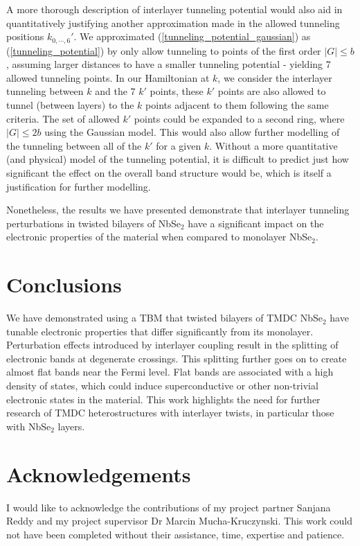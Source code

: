 \documentclass[12pt]{report} %
\begin{document}
A more thorough description of interlayer tunneling potential would also aid in quantitatively justifying another approximation made in the allowed tunneling positions $k_{0, \cdots, 6}'$. We approximated (\ref{tunneling_potential_gaussian}) as (\ref{tunneling_potential}) by only allow tunneling to points of the first order $|G| \leq b$, assuming larger distances to have a smaller tunneling potential - yielding 7 allowed tunneling points. In our Hamiltonian at $k$, we consider the interlayer tunneling between $k$ and the 7 $k'$ points, these $k'$ points are also allowed to tunnel (between layers) to the $k$ points adjacent to them following the same criteria. The set of allowed $k'$ points could be expanded to a second ring, where $|G| \leq 2b$ using the Gaussian model. This would also allow further modelling of the tunneling between all of the $k'$ for a given $k$. Without a more quantitative (and physical) model of the tunneling potential, it is difficult to predict just how significant the effect on the overall band structure would be, which is itself a justification for further modelling.

Nonetheless, the results we have presented demonstrate that interlayer tunneling perturbations in twisted bilayers of NbSe$_2$ have a significant impact on the electronic properties of the material when compared to monolayer NbSe$_2$.

\section*{Conclusions}

We have demonstrated using a TBM that twisted bilayers of TMDC NbSe$_2$ have tunable electronic properties that differ significantly from its monolayer. Perturbation effects introduced by interlayer coupling result in the splitting of electronic bands at degenerate crossings. This splitting further goes on to create almost flat bands near the Fermi level. Flat bands are associated with a high density of states, which could induce superconductive or other non-trivial electronic states in the material. This work highlights the need for further research of TMDC heterostructures with interlayer twists, in particular those with NbSe$_2$ layers.

\section*{Acknowledgements}
I would like to acknowledge the contributions of my project partner Sanjana Reddy and my project supervisor Dr Marcin Mucha-Kruczynski. This work could not have been completed without their assistance, time, expertise and patience.
\end{document}
